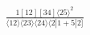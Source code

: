 \documentclass[varwidth, border=5pt]{standalone}
\begin{document}
\begin{my}
$\begin{gathered}
\scriptscriptstyle\frac{1[12][34]⟨25⟩^2}{⟨12⟩⟨23⟩⟨24⟩⟨2|1+5|2]}
\end{gathered}$
\end{my}
\end{document}
